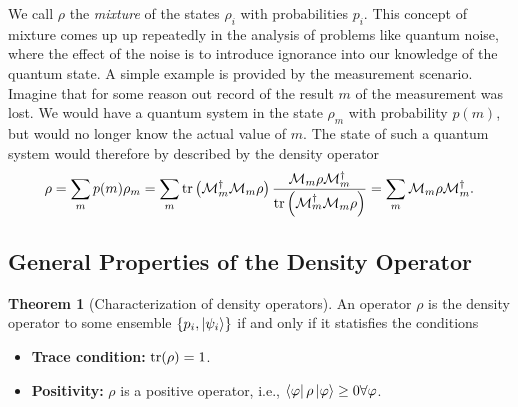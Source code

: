 \documentclass{book}
\theoremstyle{definition}
\newtheorem{thm}{Theorem}[section]
\newcommand{\M}{\mathcal{M}}
\newcommand{\f}[2]{\frac{#1}{#2}}
\newcommand{\lp}{\left(}
\newcommand{\rp}{\right)}
\begin{document}
We call $\rho$ the \textit{mixture} of the states $\rho_i$ with probabilities $p_i$. This concept of mixture comes up up repeatedly in the analysis of problems like quantum noise, where the effect of the noise is to introduce ignorance into our knowledge of the quantum state. A simple example is provided by the measurement scenario. Imagine that for some reason out record of the result $m$ of the measurement was lost. We would have a quantum system in the state $\rho_m$ with probability $p(m)$, but would no longer know the actual value of $m$. The state of such a quantum system would therefore by described by the density operator
\begin{align}
\rho = \sum_m p(m)\rho_m = \sum_m \tr\lp \M_m^\dagger \M_m \rho \rp\f{\M_m \rho \M_m^\dagger}{\tr\lp \M_m^\dagger \M_m \rho \rp} = \sum_m \M_m \rho \M_m^\dagger.
\end{align}






























\subsection{General Properties of the Density Operator}



\begin{thm}[Characterization of density operators] 
	An operator $\rho$ is the density operator to some ensemble $\{p_i, \ket{\psi_i} \}$ if and only if it statisfies the conditions
	\begin{itemize}
		\item \textbf{Trace condition:} $\tr(\rho) = 1$.
		\item \textbf{Positivity:} $\rho$ is a positive operator, i.e., $\bra{\varphi}\rho\ket{\varphi} \geq 0 \forall \varphi$.
	\end{itemize}
\end{thm}
\end{document}
